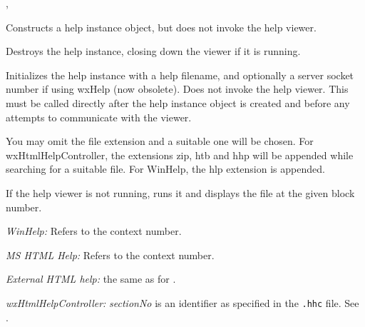 , 




Constructs a help instance object, but does not invoke the help viewer.



Destroys the help instance, closing down the viewer if it is running.

\label{wxhelpcontrollerinitialize}



Initializes the help instance with a help filename, and optionally a server socket
number if using wxHelp (now obsolete). Does not invoke the help viewer.
This must be called directly after the help instance object is created and before
any attempts to communicate with the viewer.

You may omit the file extension and a suitable one will be chosen. For
wxHtmlHelpController, the extensions zip, htb and hhp will be appended while searching for
a suitable file. For WinHelp, the hlp extension is appended.

\label{wxhelpcontrollerdisplayblock}


If the help viewer is not running, runs it and displays the file at the given block number.

{\it WinHelp:} Refers to the context number.

{\it MS HTML Help:} Refers to the context number.

{\it External HTML help:} the same as for .

{\it wxHtmlHelpController:} {\it sectionNo} is an identifier as specified in the {\tt .hhc} file. See .

